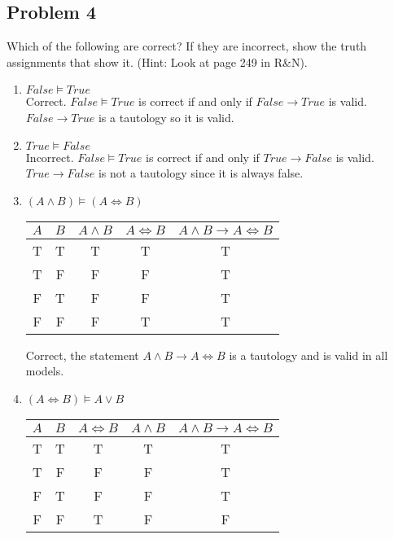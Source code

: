 \documentclass{math}
\begin{document}
\subsection*{Problem 4}
Which of the following are correct? If they are incorrect, show the truth
assignments that show it. (Hint: Look at page 249 in R\&N).
\begin{enumerate}
  \item \( False\models True \) \\
  Correct. \( False\models True \) is correct if and only if
  \( False\to True \) is valid. \( False\to True \) is a tautology so it is
  valid.
  \item \( True\models False \) \\
  Incorrect. \( False\models True \) is correct if and only if
  \( True\to False \) is valid. \( True\to False \) is not a tautology since it
  is always false.
  \item \( (A\wedge B)\models (A\Leftrightarrow B) \)
  \begin{center}
    \begin{tabular}{|c|c|c|c|c|}
      \hline
      \( A \) & \( B \) & \( A\wedge B \) & \( A\Leftrightarrow B \) &
        \( A\wedge B\to A\Leftrightarrow B \) \\
      \hline
      T & T & T & T & T \\
      T & F & F & F & T \\
      F & T & F & F & T \\
      F & F & F & T & T \\
      \hline
    \end{tabular}
  \end{center}
  Correct, the statement \( A\wedge B\to A\Leftrightarrow B \) is a tautology
  and is valid in all models.
  \item \( (A\Leftrightarrow B)\models A\vee B \)
  \begin{center}
    \begin{tabular}{|c|c|c|c|c|}
      \hline
      \( A \) & \( B \) & \( A\Leftrightarrow B \) & \( A\wedge B \) &
        \( A\wedge B\to A\Leftrightarrow B \) \\
      \hline
      T & T & T & T & T \\
      T & F & F & F & T \\
      F & T & F & F & T \\
      F & F & T & F & F \\
      \hline
    \end{tabular}
  \end{center}

\end{enumerate}
\end{document}
